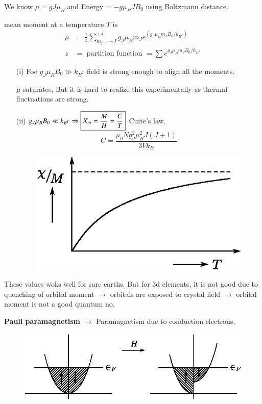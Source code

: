 We know $\mu=gJ\mu_{B}$ and Energy = $-g\mu_{B}JB_{0}$ using Boltzmann distance.

mean moment at a temperature $T$ is
\begin{align*}
\overline{\mu} &= \frac{1}{z}\sum\limits^{+J}_{m_{j}=-J}g_{J}\mu_{B}m_{J}e^{(g_{J}\mu_{B}m_{J}B_{0}/k_{B^{T}})}\\
z &= \text{ partition function } = \sum e^{g_{J}\mu_{B}m_{J}B_{0}/k_{B^{T}}}
\end{align*}
\begin{itemize}
\item[(i)] Foe $g_{J}\mu_{B}B_{0}\gg k_{B^{T}}$ field is strong enough to align all the moments.

$\mu$ saturates, But it is hard to realize this experimentally as thermal fluctuations are strong.

\item[(ii)] $g_{J}\mu_{B}B_{0}\ll k_{B^{T}}\Rightarrow \fbox{$X_{m}=\dfrac{M}{H}=\dfrac{C}{T}$}$ Curie's law.
$$
C=\dfrac{\mu_{0}Ng^{2}_{J}\mu^{2}_{B}J(J+1)}{3Vk_{B}}
$$
\begin{figure}[H]
\centering
\includegraphics[scale=.8]{images/lecture25/fig9.eps}
\end{figure}
\end{itemize}
These values woks well for rare earths. But for 3d elements, it is not good due to quenching of orbital moment $\to$ orbitals are exposed to crystal field $\to$ orbital moment is not a good quantum no. 

{\bf Pauli paramagnetism} $\to$ Paramagnetism due to conduction electrons.
\begin{figure}[H]
\centering
\includegraphics[scale=.8]{images/lecture25/fig10.eps}
\end{figure}

